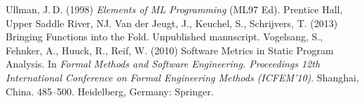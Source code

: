 \documentclass[12pt,abstracton]{scrartcl}
\begin{document}
\begin{thebibliography}{99}
 Ullman, J.\,D. (1998) \emph{Elements of ML Programming} (ML97 Ed). Prentice Hall, Upper Saddle River, NJ.
 Van der Jeugt, J., Keuchel, S., Schrijvers, T. (2013) Bringing Functions into the Fold. Unpublished manuscript.
 Vogelsang, S., Fehnker, A., Huuck, R., Reif, W. (2010) Software Metrics in Static Program Analysis. In \emph{Formal Methods and Software Engineering. Proceedings 12th International Conference on Formal Engineering Methods (ICFEM'10)}. Shanghai, China. 485--500. Heidelberg, Germany: Springer.
\end{thebibliography}
\end{document}

